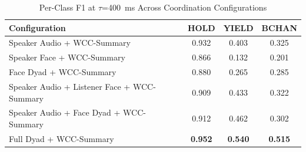 \begin{table}[h]
\caption{Per-Class F1 at $\tau$=400~ms Across Coordination Configurations}
\label{tab:f1_per_class_coordination}
\small
\renewcommand{\arraystretch}{1.20}
\begin{tabular}{>{\raggedright\arraybackslash}p{4cm}ccc}
\toprule
Configuration & HOLD & YIELD & BCHAN \\
\midrule
Speaker Audio + WCC-Summary & 0.932 & 0.403 & 0.325 \\
Speaker Face + WCC-Summary & 0.866 & 0.132 & 0.201 \\
Face Dyad + WCC-Summary & 0.880 & 0.265 & 0.285 \\
Speaker Audio + Listener Face + WCC-Summary & 0.909 & 0.433 & 0.322 \\
Speaker Audio + Face Dyad + WCC-Summary & 0.912 & 0.462 & 0.302 \\
Full Dyad + WCC-Summary & \textbf{0.952} & \textbf{0.540} & \textbf{0.515} \\
\bottomrule
\end{tabular}
\end{table}
